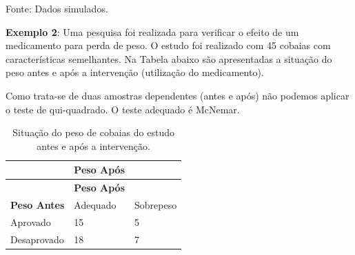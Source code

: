 \documentclass[12pt,brazil,oneside]{book}
\begin{document}
Fonte: Dados simulados.

\textbf{Exemplo 2}: Uma pesquisa foi realizada para verificar o efeito de um medicamento para perda de peso. O estudo foi realizado com 45 cobaias com características semelhantes. Na Tabela abaixo são apresentadas a situação do peso antes e após a intervenção (utilização do medicamento).

Como trata-se de duas amostras dependentes (antes e após) não podemos aplicar o teste de qui-quadrado. O teste adequado é McNemar.

\begin{longtable}[]{@{}lll@{}}
\caption{\label{tab:sitcob}Situação do peso de cobaias do estudo antes e após a intervenção.}\tabularnewline
\toprule
\begin{minipage}[b]{0.35\columnwidth}\raggedright
\strut
\end{minipage} & \begin{minipage}[b]{0.25\columnwidth}\raggedright
\textbf{Peso Após}\strut
\end{minipage} & \begin{minipage}[b]{0.25\columnwidth}\raggedright
\strut
\end{minipage}\tabularnewline
\midrule
\endfirsthead
\toprule
\begin{minipage}[b]{0.35\columnwidth}\raggedright
\strut
\end{minipage} & \begin{minipage}[b]{0.25\columnwidth}\raggedright
\textbf{Peso Após}\strut
\end{minipage} & \begin{minipage}[b]{0.25\columnwidth}\raggedright
\strut
\end{minipage}\tabularnewline
\midrule
\endhead
\begin{minipage}[t]{0.35\columnwidth}\raggedright
\textbf{Peso Antes}\strut
\end{minipage} & \begin{minipage}[t]{0.25\columnwidth}\raggedright
Adequado\strut
\end{minipage} & \begin{minipage}[t]{0.25\columnwidth}\raggedright
Sobrepeso\strut
\end{minipage}\tabularnewline
\begin{minipage}[t]{0.35\columnwidth}\raggedright
Aprovado\strut
\end{minipage} & \begin{minipage}[t]{0.25\columnwidth}\raggedright
15\strut
\end{minipage} & \begin{minipage}[t]{0.25\columnwidth}\raggedright
5\strut
\end{minipage}\tabularnewline
\begin{minipage}[t]{0.35\columnwidth}\raggedright
Desaprovado\strut
\end{minipage} & \begin{minipage}[t]{0.25\columnwidth}\raggedright
18\strut
\end{minipage} & \begin{minipage}[t]{0.25\columnwidth}\raggedright
7\strut
\end{minipage}\tabularnewline
\bottomrule
\end{longtable}
\end{document}
